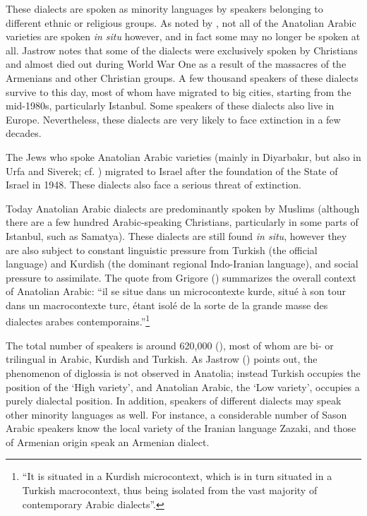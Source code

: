 \documentclass[output=paper]{langsci/langscibook}
\begin{document}
These dialects are spoken as minority languages by speakers belonging to different ethnic or religious groups. As noted by \cite{Jastrow2006}, not all of the Anatolian Arabic varieties are spoken \textit{in situ} however, and in fact some may no longer be spoken at all. Jastrow notes that some of the dialects were exclusively spoken by Christians and almost died out during World War One as a result of the massacres of the Armenians and other Christian groups. A few thousand speakers of these dialects survive to this day, most of whom have migrated to big cities, starting from the mid-1980s, particularly Istanbul. Some speakers of these dialects also live in Europe. Nevertheless, these dialects are very likely to face extinction in a few decades. 

The Jews who spoke Anatolian Arabic varieties (mainly in Diyarbak{\i}r, but also in Urfa and Siverek; cf. \citealt{Nevo1999}) migrated to Israel after the foundation of the State of Israel in 1948. These dialects also face a serious threat of extinction. 

Today Anatolian Arabic dialects are predominantly spoken by Muslims (although there are a few hundred Arabic-speaking Christians, particularly in some parts of Istanbul, such as Samatya). These dialects are still found \textit{in situ}, however they are also subject to constant linguistic pressure from Turkish (the official language) and Kurdish (the dominant regional Indo-Iranian language), and social pressure to assimilate. The quote from Grigore (\citeyear[27]{Grigore2007book}) summarizes the overall context of Anatolian Arabic: ``il se situe dans un microcontexte kurde, situé à son tour dans un macrocontexte turc, étant isolé de la sorte de la grande masse des dialectes arabes contemporains.''\footnote{``It is situated in a Kurdish microcontext, which is in turn situated in a Turkish macrocontext, thus being isolated from the vast majority of contemporary Arabic dialects''.} 

The total number of speakers is around 620,000 (\citealt[162]{Procházka2018Anatolian}), most of whom are bi- or trilingual in
Arabic, Kurdish and Turkish. As Jastrow (\citeyear[88]{Jastrow2011anatolian}) points out, the phenomenon of diglossia is not observed in Anatolia; instead Turkish occupies the position of the `High variety', and
Anatolian Arabic, the `Low variety', occupies a purely dialectal position. In addition, speakers of
different dialects may speak other minority languages as well. For instance, a considerable number of Sason Arabic speakers know the local variety of the Iranian language Zazaki, and those of Armenian origin speak an Armenian dialect.
\end{document}
